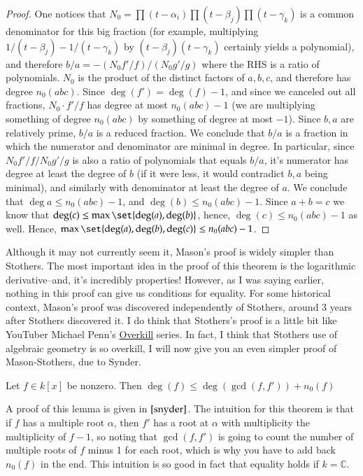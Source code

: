 \documentclass[12pt]{article}
\newenvironment{lemma}{\begin{mylemma}}{\end{mylemma}}
\theoremstyle{definitionstyle}
\def\mbb#1{\mathbb{#1}}
\def \C{\mbb{C}}
\begin{document}
\begin{proof}
	One notices that $N_0 = \prod (t-\alpha_i) \prod (t-\beta_j) \prod (t-\gamma_k)$ is a common denominator for this big fraction (for example, multiplying $1/(t-\beta_j) - 1/(t-\gamma_k)$ by $(t-\beta_j)(t-\gamma_k)$ certainly yields a polynomial), and therefore $b/a = -(N_0f'/f)/(N_0g'/g)$ where the RHS is a ratio of polynomials. $N_0$ is the product of the distinct factors of $a, b, c$, and therefore has degree $n_0(abc)$. Since $\deg(f') = \deg(f) - 1$, and since we canceled out all fractions, $N_0 \cdot f'/f$ has degree at most $n_0(abc)-1$ (we are multiplying something of degree $n_0(abc)$ by something of degree at most $-1$). Since $b, a$ are relatively prime, $b/a$ is a reduced fraction. We conclude that $b/a$ is a fraction in which the numerator and denominator are minimal in degree. In particular, since $N_0f'/f / N_0 g'/g$ is also a ratio of polynomials that equals $b/a$, it's numerator has degree at least the degree of $b$ (if it were less, it would contradict $b, a$ being minimal), and similarly with denominator at least the degree of $a$. We conclude that $\deg{a} \leq n_0(abc)-1$, and $\deg(b) \leq n_0(abc)-1$. Since $a+b=c$ we know that $\deg(c) \leq \max\set{\deg(a), \deg(b)}$, hence, $\deg(c) \leq n_0(abc)-1$ as well. Hence, $\max\set{\deg(a), \deg(b), \deg(c)} \leq n_0(abc)-1$.
\end{proof}
Although it may not currently seem it, Mason's proof is widely simpler than Stothers. The most important idea in the proof of this theorem is the logarithmic derivative--and, it's incredibly properties! However, as I was saying earlier, nothing in this proof can give us conditions for equality. For some historical context, Mason's proof was discovered independently of Stothers, around 3 years after Stothers discovered it. I do think that Stothers's proof is a little bit like YouTuber Michael Penn's \href{https://www.youtube.com/playlist?list=PL22w63XsKjqx8nFAU8ew8-YM2YOOClNGw}{Overkill} series. In fact, I think that Stothers use of algebraic geometry is so overkill, I will now give you an even simpler proof of Mason-Stothers, due to Synder.
\begin{lemma}
	Let $f \in k[x]$ be nonzero. Then $\deg(f) \leq \deg(\gcd(f, f')) + n_0(f)$
\end{lemma}
A proof of this lemma is given in $\cite{snyder}$. The intuition for this theorem is that if $f$ has a multiple root $\alpha$, then $f'$ has a root at $\alpha$ with multiplicity the multiplicity of $f - 1$, so noting that $\gcd(f, f')$ is going to count the number of multiple roots of $f$ minus 1 for each root, which is why you have to add back $n_0(f)$ in the end. This intuition is so good in fact that equality holds if $k = \C$.
\end{document}
